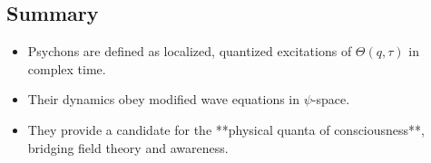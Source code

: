 \subsection*{Summary}

\begin{itemize}
  \item Psychons are defined as localized, quantized excitations of \(\Theta(q, \tau)\) in complex time.
  \item Their dynamics obey modified wave equations in \(\psi\)-space.
  \item They provide a candidate for the **physical quanta of consciousness**, bridging field theory and awareness.
\end{itemize}
